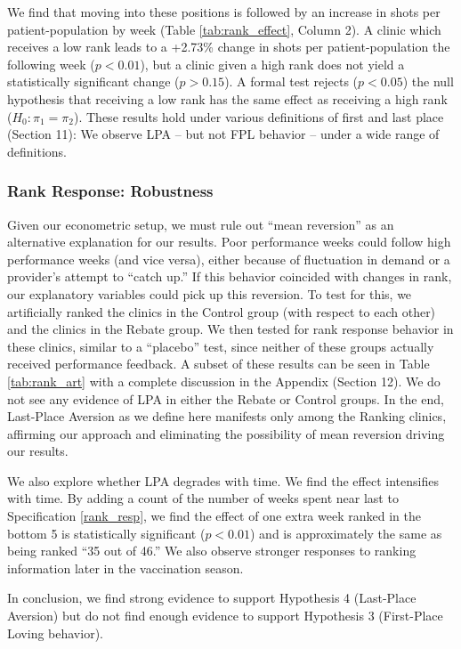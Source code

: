  We find that moving into these positions is followed by an increase in shots per patient-population by week (Table \ref{tab:rank_effect}, Column 2). A clinic which receives a low rank leads to a +2.73\% change in shots per patient-population the following week ($p < 0.01$), but a clinic given a high rank does not yield a statistically significant change ($p > 0.15$). A formal test rejects ($p < 0.05$) the null hypothesis that receiving a low rank has the same effect as receiving a high rank ($H_0: \pi_1 = \pi_2$). These results hold under various definitions of first and last place (Section 11): We observe LPA – but not FPL behavior – under a wide range of definitions. 
 
 \subsubsection{Rank Response: Robustness} \label{rpf_robust}
 Given our econometric setup, we must rule out “mean reversion” as an alternative explanation for our results. Poor performance weeks could follow high performance weeks (and vice versa), either because of fluctuation in demand or a provider’s attempt to “catch up.” If this behavior coincided with changes in rank, our explanatory variables could pick up this reversion. To test for this, we artificially ranked the clinics in the Control group (with respect to each other) and the clinics in the Rebate group. We then tested for rank response behavior in these clinics, similar to a “placebo” test, since neither of these groups actually received performance feedback. A subset of these results can be seen in Table \ref{tab:rank_art} with a complete discussion in the Appendix (Section 12). We do not see any evidence of LPA in either the Rebate or Control groups. In the end, Last-Place Aversion as we define here manifests only among the Ranking clinics, affirming our approach and eliminating the possibility of mean reversion driving our results.
 
 We also explore whether LPA degrades with time. We find the effect intensifies with time. By adding a count of the number of weeks spent near last to Specification \ref{rank_resp}, we find the effect of one extra week ranked in the bottom 5 is statistically significant ($p < 0.01$) and is approximately the same as being ranked “35 out of 46.” We also observe stronger responses to ranking information later in the vaccination season.
 
 In conclusion, we find strong evidence to support Hypothesis 4 (Last-Place Aversion) but do not find enough evidence to support Hypothesis 3 (First-Place Loving behavior). 
 
